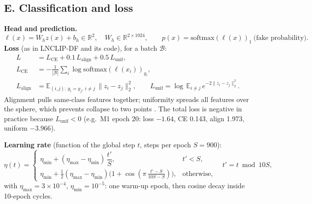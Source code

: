 \documentclass[10pt,a4paper]{article}
\begin{document}
\subsection{E. Classification and loss}\label{sec:loss}
\textbf{Head and prediction.}
\begin{equation}
\ell(x)=W_h z(x)+b_h\in\mathbb{R}^2,\quad W_h\in\mathbb{R}^{2\times1024},\qquad
p(x)=\mathrm{softmax}(\ell(x))_1\ \text{(fake probability)}.
\end{equation}
\textbf{Loss} (as in LNCLIP-DF and its code), for a batch \(\mathcal{B}\):
\begin{align}
L&=L_\text{CE}+0.1\,L_\text{align}+0.5\,L_\text{unif},\\
L_\text{CE}&=-\tfrac{1}{|\mathcal{B}|}\textstyle\sum_{i}\log\mathrm{softmax}(\ell(x_i))_{y_i},\\
L_\text{align}&=\mathbb{E}_{(i,j):\,y_i=y_j,\,i\ne j}\,\|z_i-z_j\|_2^2,\qquad
L_\text{unif}=\log\,\mathbb{E}_{i\ne j}\,e^{-2\|z_i-z_j\|_2^2}.
\end{align}
Alignment pulls same-class features together; uniformity spreads all features over the sphere, which
prevents collapse to two points \cite{wang2020alignment}. The total loss is negative in practice
because \(L_\text{unif}<0\) (e.g.\ M1 epoch 20: loss \(-1.64\), CE 0.143, align 1.973, uniform \(-3.966\)).

\textbf{Learning rate} (function of the global step \(t\), steps per epoch \(S=900\)):
\begin{equation}
\eta(t)=\begin{cases}\eta_\text{min}+(\eta_\text{max}-\eta_\text{min})\,\dfrac{t'}{S}, & t'<S,\\[6pt]
\eta_\text{min}+\tfrac12(\eta_\text{max}-\eta_\text{min})\big(1+\cos(\pi\,\tfrac{t'-S}{10S-S})\big), & \text{otherwise,}\end{cases}
\quad t'=t\bmod 10S,
\end{equation}
with \(\eta_\text{max}=3\times10^{-4}\), \(\eta_\text{min}=10^{-5}\): one warm-up epoch, then cosine
decay inside 10-epoch cycles.
\end{document}
